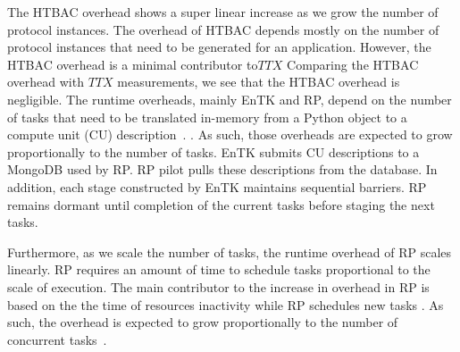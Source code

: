 The HTBAC overhead shows a super linear increase as we grow the number of
protocol instances.
The overhead of HTBAC depends mostly on the number of protocol instances that
need to be generated for an application. However, the HTBAC overhead is a
minimal contributor to\(TTX\)   Comparing the HTBAC overhead with \(TTX\)
measurements, we see that the HTBAC overhead is negligible. The runtime
overheads, mainly EnTK and RP, depend on the number of tasks that need to be
translated in-memory from a Python object to a compute unit (CU)
description~\cite{dakka2017}. 
. As such, those
overheads are expected to grow proportionally to the number of tasks. EnTK
submits CU descriptions to a MongoDB used by RP. RP pilot pulls these
descriptions from the database.
In addition, each stage constructed by EnTK maintains sequential barriers.
 RP remains dormant until completion of the
current tasks before staging the next tasks.


Furthermore, as we scale the number of tasks, the runtime overhead of RP
scales linearly. RP requires an amount of time to schedule tasks proportional
to the scale of execution. The main contributor to the increase in overhead
in RP  is based on the
 the time of resources
inactivity while RP schedules new tasks . As such,
the overhead is expected to grow proportionally to the number of concurrent
tasks~\cite{dakka2017}.

